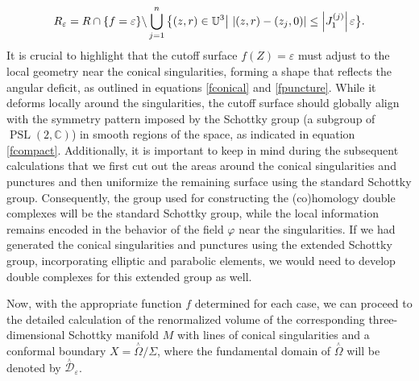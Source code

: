 \documentclass[a4paper,11pt]{article}
\newcommand{\PSLC}{\operatorname{PSL}(2,\mathbb{C})}
\newcommand{\singrigon}{\overset{{}_{\curlywedge}}{\Omega}}
\newcommand{\singfund}{\overset{{}_{\curlywedge}}{\mathcal{D}}}
\begin{document}
\begin{equation}
R_{\varepsilon} = R\cap\{f=\varepsilon\}\backslash \bigcup_{j=1}^{n}\big{\{}(z,r)\in\mathbb{U}^3\big| ~|(z,r)-(z_j,0)| \leq \Big|J_{1}^{(j)}\Big|\hspace{.5mm}\varepsilon\big{\}}.\label{Repsilon}
\end{equation}
It is crucial to highlight that the cutoff surface $f(Z) = \varepsilon$ must adjust to the local geometry near the conical singularities, forming a shape that reflects the angular deficit, as outlined in equations \eqref{fconical} and \eqref{fpuncture}. While it deforms locally around the singularities,  the cutoff surface should globally align with the symmetry pattern imposed by the Schottky group (a subgroup of $\PSLC$) in smooth regions of the space, as indicated in equation \eqref{fcompact}. Additionally, it is important to keep in mind during the subsequent calculations that we first cut out the areas around the conical singularities and punctures and then uniformize the remaining surface using the standard Schottky group. Consequently, the group used for constructing the (co)homology double complexes will be the standard Schottky group, while the local information remains encoded in the behavior of the field 
$\varphi$ near the singularities. If we had generated the conical singularities and punctures using the extended Schottky group, incorporating elliptic and parabolic elements, we would need to develop double complexes for this extended group as well.





Now, with the appropriate function $f$ determined for each case, we can proceed to the detailed calculation of the renormalized volume of the corresponding three-dimensional Schottky manifold $M$ with lines of conical singularities and a conformal boundary $X= \singrigon\slash\Sigma$, where the fundamental domain of $\singrigon$ will be denoted by $\singfund_{\varepsilon}$.
\end{document}
